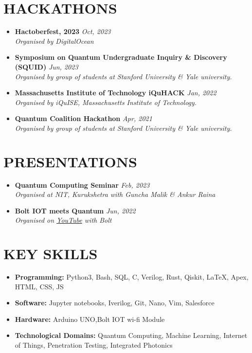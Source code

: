 \documentclass[12pt]{my_cv}
\begin{document}
\section{HACKATHONS}
\begin{itemize}
\item \textbf{Hactoberfest, 2023} \hfill \textit{Oct, 2023}
\\ \textit{Organised by DigitalOcean}
\item \textbf{Symposium on Quantum Undergraduate Inquiry \& Discovery (SQUID)} \hfill \textit{Jun, 2023}
\\ \textit{Organised by group of students at Stanford University \& Yale university.}
\item \textbf{Massachusetts Institute of Technology iQuHACK} \hfill \textit{Jan, 2022}
\\ \textit{Organised by iQuISE, Massachusetts Institute of Technology.}
\item \textbf{Quantum Coalition Hackathon} \hfill \textit{Apr, 2021}
\\ \textit{Organised by group of students at Stanford University \& Yale university.}
\end{itemize}
\section{PRESENTATIONS}
\begin{itemize}
\item \textbf{Quantum Computing Seminar} \hfill \textit{Feb, 2023}
\\ \textit{Organised at NIT, Kurukshetra with Guncha Malik \& Ankur Raina}
\item \textbf{Bolt IOT meets Quantum} \hfill \textit{Jun, 2022}
\\ \textit{Organised on \href{https://youtu.be/iIxJa3kAFyI}{YouTube} with Bolt}
\end{itemize}
\section{KEY SKILLS}
\begin{itemize}
\item \textbf{Programming:} Python3, Bash, SQL, C, Verilog, Rust, Qiskit, \LaTeX, Apex, HTML, CSS, JS
\item \textbf{Software:} Jupyter notebooks, Iverilog, Git, Nano, Vim, Salesforce
\item \textbf{Hardware:} Arduino UNO,Bolt IOT wi-fi Module
\item \textbf{Technological Domains:} Quantum Computing, Machine Learning, Internet of Things, Penetration Testing, Integrated
Photonics
\end{itemize}
\end{document}
